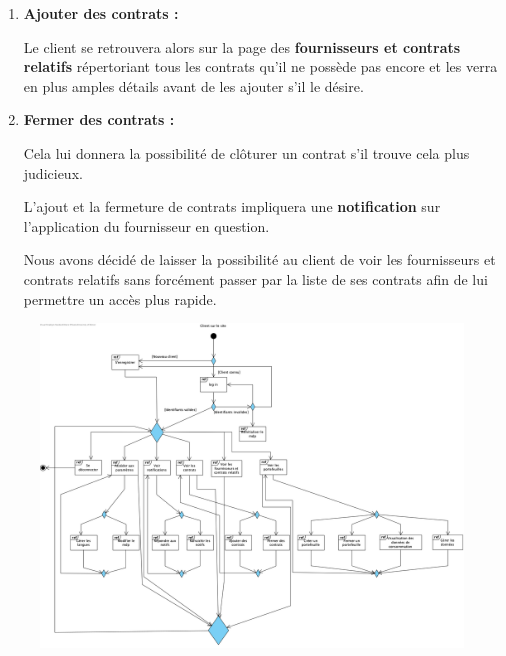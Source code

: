 \begin{enumerate}[-]
\item \textbf{Ajouter des contrats :}\newline

Le client se retrouvera alors sur la page des \textbf{fournisseurs et contrats relatifs} répertoriant tous les contrats qu’il ne possède pas encore et les verra en plus amples détails avant de les ajouter s’il le désire.

\item \textbf{Fermer des contrats :}\newline

Cela lui donnera la possibilité de clôturer un contrat s’il trouve cela plus judicieux.\newline

L’ajout et la fermeture de contrats impliquera une \textbf{notification} sur l’application du fournisseur en question.\newline

Nous avons décidé de laisser la possibilité au client de voir les fournisseurs et contrats relatifs sans forcément passer par la liste de ses contrats afin de lui permettre un accès plus rapide.
\end{enumerate}

\newpage

\begin{figure}[h]
\centering
\includegraphics[width = 1\textwidth]{Base/overview/img/overview-client.png}
\end{figure}

\newpage

